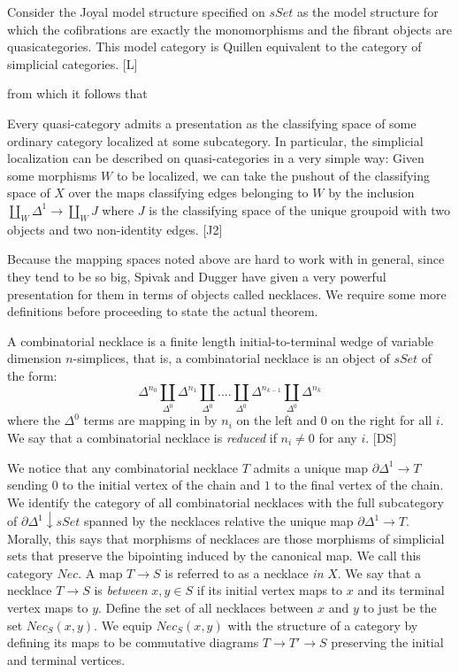 \documentclass{amsart}
\begin{document}
\begin{thm}[Lurie]
Consider the Joyal model structure specified on $sSet$ as the model structure for which the cofibrations are exactly the monomorphisms and the fibrant objects are quasicategories.  This model category is Quillen equivalent to the category of simplicial categories.  [L]
\end{thm}

from which it follows that

\begin{thm}[Joyal]
Every quasi-category admits a presentation as the classifying space of some ordinary category localized at some subcategory.  In particular, the simplicial localization can be described on quasi-categories in a very simple way: Given some morphisms $W$ to be localized, we can take the pushout of the classifying space of $X$ over the maps classifying edges belonging to $W$ by the inclusion $\coprod_W\Delta^1\to \coprod_WJ$ where $J$ is the classifying space of the unique groupoid with two objects and two non-identity edges. [J2]
\end{thm}

Because the mapping spaces noted above are hard to work with in general, since they tend to be so big, Spivak and Dugger have given a very powerful presentation for them in terms of objects called necklaces.  We require some more definitions before proceeding to state the actual theorem.

\begin{defn}
A combinatorial necklace is a finite length initial-to-terminal wedge of variable dimension $n$-simplices, that is, a combinatorial necklace is an object of $sSet$ of the form: $$\Delta^{n_0}\coprod_{\Delta^0}\Delta^{n_1}\coprod_{\Delta^0}....\coprod_{\Delta^0}\Delta^{n_{k-1}}\coprod_{\Delta^0} \Delta^{n_k}$$ where the $\Delta^0$ terms are mapping in by $n_i$ on the left and $0$ on the right for all $i$.  We say that a combinatorial necklace is \emph{reduced} if $n_i\neq 0$ for any $i$.  [DS]
\end{defn}

We notice that any combinatorial necklace $T$ admits a unique map $\partial \Delta^1\to T$ sending $0$ to the initial vertex of the chain and $1$ to the final vertex of the chain.  We identify the category of all combinatorial necklaces with the full subcategory of $\partial\Delta^1\downarrow sSet$ spanned by the necklaces relative the unique map $\partial \Delta^1\to T$.  Morally, this says that morphisms of necklaces are those morphisms of simplicial sets that preserve the bipointing induced by the canonical map.  We call this category $Nec$.  A map $T\to S$ is referred to as a necklace \emph{in} $X$.  We say that a necklace $T\to S$ is \emph{between} $x,y\in S$ if its initial vertex maps to $x$ and its terminal vertex maps to $y$.  Define the set of all necklaces between $x$ and $y$ to just be the set $Nec_S(x,y)$.  We equip $Nec_S(x,y)$ with the structure of a category by defining its maps to be commutative diagrams $T\to T'\to S$ preserving the initial and terminal vertices.
\end{document}
